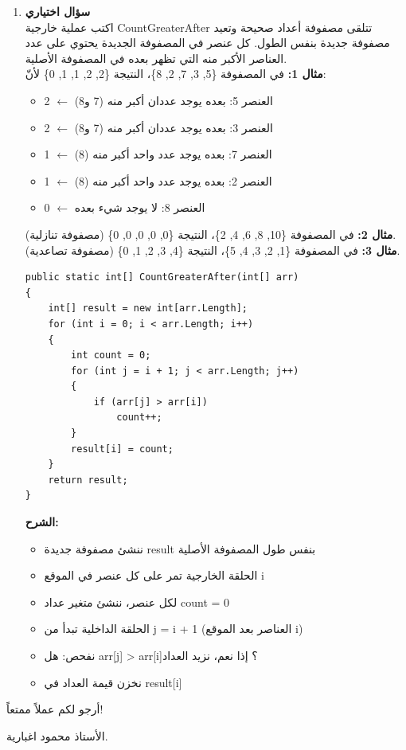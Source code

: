 \documentclass[14pt]{extarticle}
\begin{document}
\begin{enumerate}[itemsep=2em]
    \clearpage
    \item \textbf{سؤال اختياري} \\
    اكتب عملية خارجية \textenglish{CountGreaterAfter} تتلقى مصفوفة أعداد صحيحة وتعيد مصفوفة جديدة بنفس الطول. كل عنصر في المصفوفة الجديدة يحتوي على عدد العناصر الأكبر منه التي تظهر بعده في المصفوفة الأصلية.\\
    \textbf{مثال 1:} في المصفوفة \textenglish{\{5, 3, 7, 2, 8\}}، النتيجة \textenglish{\{2, 2, 1, 1, 0\}} لأنّ:
    \begin{itemize}[itemsep=1pt]
        \item العنصر 5: بعده يوجد عددان أكبر منه (7 و8) $\leftarrow$ 2
        \item العنصر 3: بعده يوجد عددان أكبر منه (7 و8) $\leftarrow$ 2
        \item العنصر 7: بعده يوجد عدد واحد أكبر منه (8) $\leftarrow$ 1
        \item العنصر 2: بعده يوجد عدد واحد أكبر منه (8) $\leftarrow$ 1
        \item العنصر 8: لا يوجد شيء بعده $\leftarrow$ 0
    \end{itemize}
    \textbf{مثال 2:} في المصفوفة \textenglish{\{10, 8, 6, 4, 2\}}، النتيجة \textenglish{\{0, 0, 0, 0, 0\}} (مصفوفة تنازلية).\\
    \textbf{مثال 3:} في المصفوفة \textenglish{\{1, 2, 3, 4, 5\}}، النتيجة \textenglish{\{4, 3, 2, 1, 0\}} (مصفوفة تصاعدية).
    \ifwithsols
    \begin{boxSolution}
    \begin{english}
    \begin{verbatim}
public static int[] CountGreaterAfter(int[] arr)
{
    int[] result = new int[arr.Length];
    for (int i = 0; i < arr.Length; i++)
    {
        int count = 0;
        for (int j = i + 1; j < arr.Length; j++)
        {
            if (arr[j] > arr[i])
                count++;
        }
        result[i] = count;
    }
    return result;
}
    \end{verbatim}
    \end{english}
    \textbf{الشرح:}
    \begin{itemize}[itemsep=1pt]
        \item ننشئ مصفوفة جديدة \textenglish{result} بنفس طول المصفوفة الأصلية
        \item الحلقة الخارجية تمر على كل عنصر في الموقع \textenglish{i}
        \item لكل عنصر، ننشئ متغير عداد \textenglish{count = 0}
        \item الحلقة الداخلية تبدأ من \textenglish{j = i + 1} (العناصر بعد الموقع \textenglish{i})
        \item نفحص: هل \textenglish{arr[j] > arr[i]}؟ إذا نعم، نزيد العداد
        \item نخزن قيمة العداد في \textenglish{result[i]}
    \end{itemize}
    \end{boxSolution}
    \fi

\end{enumerate}

\vspace{1cm}
\begin{flushleft}
أرجو لكم عملاً ممتعاً!

الأستاذ محمود اغبارية.
\end{flushleft}
\end{document}
